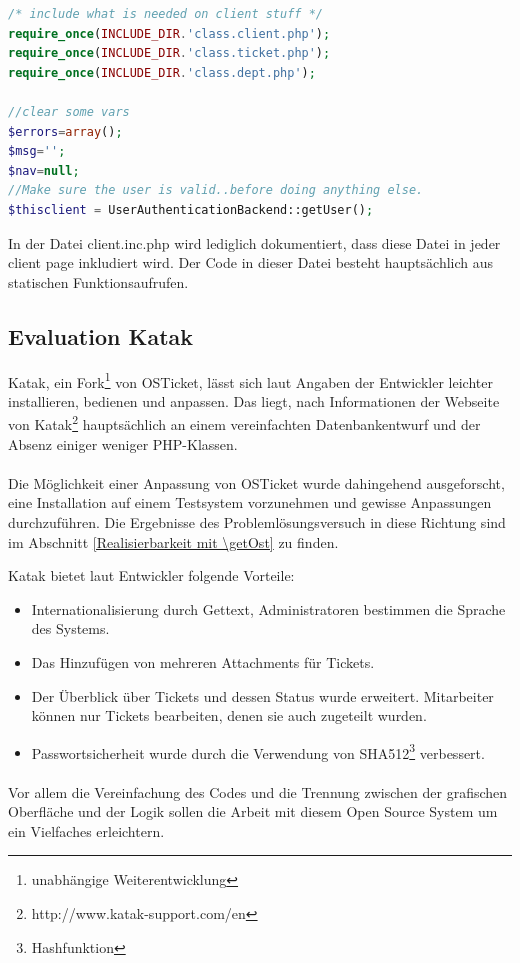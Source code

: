 \begin{lstlisting}[language=PHP, caption=client.inc.php, firstnumber=38]
/* include what is needed on client stuff */
require_once(INCLUDE_DIR.'class.client.php');
require_once(INCLUDE_DIR.'class.ticket.php');
require_once(INCLUDE_DIR.'class.dept.php');

//clear some vars
$errors=array();
$msg='';
$nav=null;
//Make sure the user is valid..before doing anything else.
$thisclient = UserAuthenticationBackend::getUser();
\end{lstlisting}
In der Datei client.inc.php wird lediglich dokumentiert, dass diese Datei in jeder client page inkludiert wird. Der Code in dieser Datei besteht hauptsächlich aus statischen Funktionsaufrufen.

\subsection{Evaluation Katak}
Katak, ein Fork\footnote{unabhängige Weiterentwicklung} von OSTicket, lässt sich laut Angaben der Entwickler leichter installieren, bedienen und anpassen. Das liegt, nach Informationen der Webseite von Katak\footnote{http://www.katak-support.com/en} hauptsächlich an einem vereinfachten Datenbankentwurf und der Absenz einiger weniger PHP-Klassen.
\paragraph{}
Die Möglichkeit einer Anpassung von OSTicket wurde dahingehend ausgeforscht, eine Installation auf einem Testsystem vorzunehmen und gewisse Anpassungen durchzuführen. Die Ergebnisse des Problemlösungsversuch in diese Richtung sind im Abschnitt \ref{Realisierbarkeit mit \getOst} zu finden.

Katak bietet laut Entwickler folgende Vorteile:
\begin{itemize}
	\item Internationalisierung durch Gettext, Administratoren bestimmen die Sprache des Systems.
	\item Das Hinzufügen von mehreren Attachments für Tickets.
	\item Der Überblick über Tickets und dessen Status wurde erweitert. Mitarbeiter können nur Tickets bearbeiten, denen sie auch zugeteilt wurden.
	\item Passwortsicherheit wurde durch die Verwendung von SHA512\footnote{Hashfunktion} verbessert.
\end{itemize}
\paragraph{}
Vor allem die Vereinfachung des Codes und die Trennung zwischen der grafischen Oberfläche und der Logik sollen die Arbeit mit diesem Open Source System um ein Vielfaches erleichtern.
\newpage

